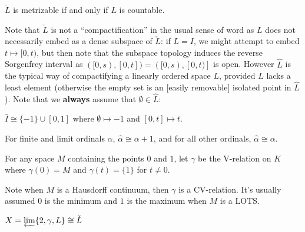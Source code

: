 \documentclass[11pt]{article}
\begin{document}
  \begin{corollary}
    \(\check L\) is metrizable if and only if \(L\) is countable.
  \end{corollary}

  Note that \(\check L\)
  is not a ``compactification'' in the usual sense of word
  as \(L\) does not necessarily
  embed as a dense subspace of \(\check L\): if \(L=I\), we might attempt to embed
  \(t\mapsto [0,t)\), but then note that the subspace topology induces the
  reverse Sorgenfrey interval as \(([0,s),[0,t])=([0,s),[0,t)]\) is open.
  However \(\hat L\) is
  the typical way of compactifying a linearly ordered space \(L\),
  provided \(L\) lacks a least element (otherwise the empty set is an [easily
  removable] isolated point in \(\hat L\)). Note that we \textbf{always}
  assume that \(\emptyset\in\hat L\):

  \begin{example}
    \(\hat I\cong\{-1\}\cup [0,1]\) where
    \(\emptyset\mapsto-1\) and \([0,t]\mapsto t\).
  \end{example}

  \begin{example}
    For finite and limit ordinals \(\alpha\), \(\hat \alpha\cong \alpha+1\),
    and for all other ordinals, \(\hat\alpha\cong\alpha\).
  \end{example}

  \begin{definition}
    For any space \(M\) containing the points \(0\) and \(1\),
    let \(\gamma\) be the V-relation on \(K\) where
    \(\gamma(0)=M\) and \(\gamma(t)=\{1\}\)
    for \(t\not=0\).
  \end{definition}

  Note when \(M\) is a Hausdorff continuum, then \(\gamma\) is a CV-relation.
  It's usually assumed \(0\) is the minimum and \(1\) is the maximum
  when \(M\) is a LOTS.

  \begin{theorem}
    \(X=\varprojlim \{2, \gamma, L\}\cong \check L\)
  \end{theorem}
\end{document}
